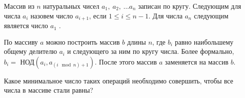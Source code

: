 Массив из $n$ натуральных чисел $a_1,\ a_2,\ \ldots a_n$ записан по кругу. Следующим для числа $a_i$ назовем число $a_{i + 1}$, если $1 \leq i \leq n - 1$. Для числа $a_n$ следующим является число $a_1$ .

По массиву $a$ можно построить массив $b$ длины $n$, где $b_i$ равно наибольшему общему делителю $a_i$ и следующего за ним по кругу числа. Более формально, $b_i =$ НОД$(a_i, a_{(i \mod n) + 1})$. После этого массив $a$ заменяется на массив $b$.

Какое минимальное число таких операций необходимо совершить, чтобы все числа в массиве стали равны?
